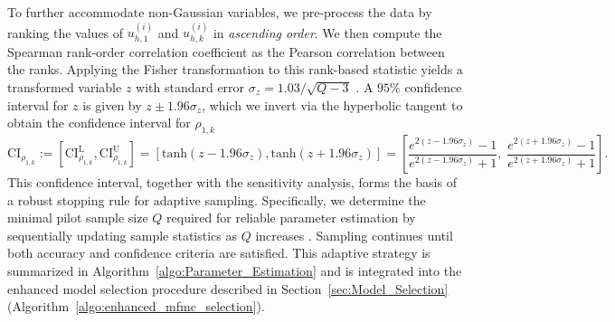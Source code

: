 To further accommodate non-Gaussian variables, we pre-process the data by ranking the values of $u_{h,1}^{(i)}$ and ${u}_{h,k}^{(i)}$ in {\it ascending order}. We then compute the Spearman rank-order correlation coefficient as the Pearson correlation between the ranks. Applying the Fisher transformation to this rank-based statistic yields a transformed variable $z$ with standard error $\sigma_z = 1.03/\sqrt{Q - 3}$ \cite{BiHi:2017, FiHaPe:1957}. A $95\%$ confidence interval for $z$ is given by $z \pm 1.96\sigma_z$, which we invert via the hyperbolic tangent to obtain the confidence interval for $\rho_{1,k}$
%
\begin{equation}
\label{eq:Confidence_Interval_rho}
    \text{CI}_{\rho_{1,k}} := \left[\text{CI}_{\rho_{1,k}}^{\text{L}},\text{CI}_{\rho_{1,k}}^{\text{U}}\right] = \left[\text{tanh}(z - 1.96\sigma_{z}),\text{tanh}(z + 1.96\sigma_{z})\right] = \left[\frac{e^{2(z - 1.96\sigma_{z})}-1}{e^{2(z - 1.96\sigma_{z})}+1},\; \frac{e^{2(z + 1.96\sigma_{z})}-1}{e^{2(z + 1.96\sigma_{z})}+1}\right].
\end{equation}
%
This confidence interval, together with the sensitivity analysis, forms the basis of a robust stopping rule for adaptive sampling. Specifically, we determine the minimal pilot sample size $Q$ required for reliable parameter estimation by sequentially updating sample statistics as $Q$ increases \cite{La:2001,Wa:1947}. Sampling continues until both accuracy and confidence criteria are satisfied. This adaptive strategy is summarized in Algorithm~\ref{algo:Parameter_Estimation} and is integrated into the enhanced model selection procedure described in Section~\ref{sec:Model_Selection} (Algorithm~\ref{algo:enhanced_mfmc_selection}).
%
